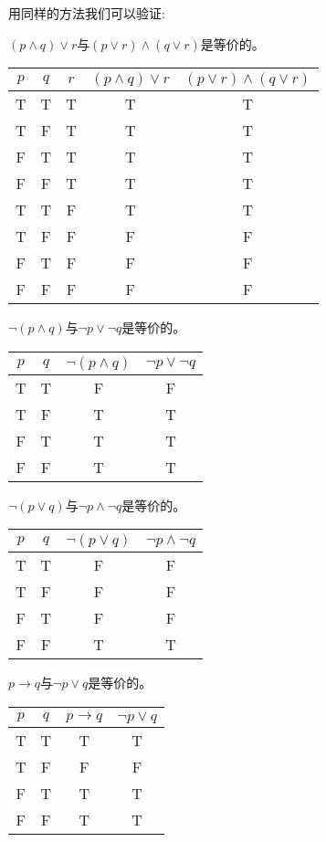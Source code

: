 \documentclass{article}
\begin{document}
\begin{CJK}{UTF8}{gbsn}
  用同样的方法我们可以验证:

  $(p\land q)\lor r$与$(p\lor r)\land (q \lor r)$是等价的。

      \begin{tabular}{ccc|cc}
    $p$& $q$& $r$&$(p\land q)\lor r$ &$(p\lor r)\land (q \lor r)$\\
    \hline
    T&T&T&T&T\\
    T&F&T&T&T\\
    F&T&T&T&T\\
      F&F&T&T&T\\
    T&T&F&T&T\\
    T&F&F&F&F\\
    F&T&F&F&F\\
        F&F&F&F&F\\
  \end{tabular}


  $\lnot (p\land q)$与$\lnot p \lor \lnot q$是等价的。

      \begin{tabular}{cc|cc}
    $p$& $q$&$\lnot (p\land q)$ &$\lnot p \lor \lnot q$\\
    \hline
    T&T&F&F\\
    T&F&T&T\\
    F&T&T&T\\
      F&F&T&T\\      
  \end{tabular}


  $\lnot (p \lor q)$与$\lnot p \land \lnot q$是等价的。
  
      \begin{tabular}{cc|cc}
    $p$& $q$&$\lnot (p \lor q)$&$\lnot p \land \lnot q$\\
    \hline
    T&T&F&F\\
    T&F&F&F\\
    F&T&F&F\\
    F&F&T&T\\      
  \end{tabular}

  $p \to q$与$\lnot p \lor q$是等价的。
  
      \begin{tabular}{cc|cc}
    $p$& $q$&$p \to q$&$\lnot p \lor q$\\
    \hline
    T&T&T&T\\
    T&F&F&F\\
    F&T&T&T\\
    F&F&T&T\\      
  \end{tabular}
  


\end{CJK}
\end{document}
